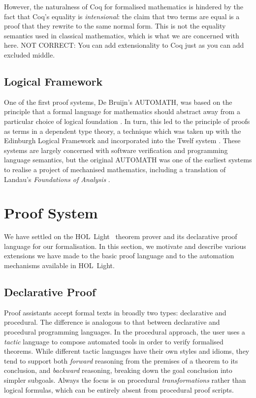 However, the naturalness of Coq for formalised mathematics is hindered by the fact that Coq's equality is \emph{intensional}: the claim that two terms are equal is a proof that they rewrite to the same normal form. This is not the equality semantics used in classical mathematics, which is what we are concerned with here.
NOT CORRECT: You can add extensionality to Coq just as you can add excluded middle.

\subsection{Logical Framework}
One of the first proof systems, De Bruijn's AUTOMATH, was based on the principle that a formal language for mathematics should abstract away from a particular choice of logical foundation \cite{AUTOMATHPTS}. In turn, this led to the principle of proofs as terms in a dependent type theory, a technique which was taken up with the Edinburgh Logical Framework and incorporated into the Twelf system \cite{Twelf}. These systems are largely concerned with software verification and programming language semantics, but the original AUTOMATH was one of the earliest systems to realise a project of mechanised mathematics, including a translation of Landau's \emph{Foundations of Analysis} \cite{LandauGrundlagen, LandauAUTOMATH}. 

\section{Proof System}
We have settled on the HOL~Light~\cite{HOLLight} theorem prover and its declarative proof language for our formalisation. In this section, we motivate and describe various extensions we have made to the basic proof language and to the automation mechanisms available in HOL~Light. 

\subsection{Declarative Proof}
Proof assistants accept formal texts in broadly two types: declarative and procedural. The difference is analogous to that between declarative and procedural programming languages. In the procedural approach, the user uses a \emph{tactic} language to compose automated tools in order to verify formalised theorems. While different tactic languages have their own styles and idioms, they tend to support both \emph{forward} reasoning from the premises of a theorem to its conclusion, and \emph{backward} reasoning, breaking down the goal conclusion into simpler subgoals. Always the focus is on procedural \emph{transformations} rather than logical formulas, which can be entirely absent from procedural proof scripts.

